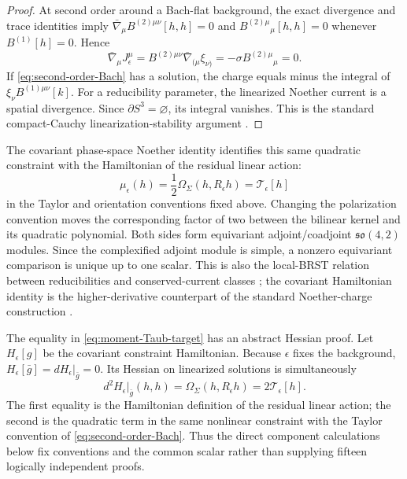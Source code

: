 \documentclass[11pt]{article}
\theoremstyle{definition}
\theoremstyle{remark}
\begin{document}
\begin{proof}
At second order around a Bach-flat background, the exact divergence and
trace identities imply
$\bar\nabla_\mu B^{(2)\mu\nu}[h,h]=0$ and
$B^{(2)\mu}{}_{\mu}[h,h]=0$ whenever $B^{(1)}[h]=0$.  Hence
\begin{equation}
 \bar\nabla_\mu J_\epsilon^\mu
 =B^{(2)\mu\nu}\bar\nabla_{(\mu}\xi_{\nu)}
 =-\sigma B^{(2)\mu}{}_{\mu}=0.
\end{equation}
If \eqref{eq:second-order-Bach} has a solution, the charge equals minus the
integral of $\xi_\nu B^{(1)\mu\nu}[k]$.  For a reducibility parameter, the
linearized Noether current is a spatial divergence.  Since
$\partial S^3=\varnothing$, its integral vanishes.  This is the standard
compact-Cauchy linearization-stability argument
\cite{AltasTekinLinearization,AltasTekinTaub}.
\end{proof}

The covariant phase-space Noether identity identifies this same quadratic
constraint with the Hamiltonian of the residual linear action:
\begin{equation}\label{eq:moment-Taub-target}
 \mu_\epsilon(h)
 =\frac12\Omega_\Sigma(h,R_\epsilon h)
 =\mathcal T_\epsilon[h]
\end{equation}
in the Taylor and orientation conventions fixed above.  Changing the
polarization convention moves the corresponding factor of two between the
bilinear kernel and its quadratic polynomial.  Both sides form equivariant
adjoint/coadjoint $\mathfrak{so}(4,2)$ modules.  Since the complexified
adjoint module is simple, a nonzero equivariant comparison is unique up to
one scalar.  This is also the local-BRST relation between reducibilities and
conserved-current classes
\cite{BarnichAntifield,BarnichBrandtHenneaux}; the covariant Hamiltonian
identity is the higher-derivative counterpart of the standard Noether-charge
construction \cite{IyerWald}.

The equality in \eqref{eq:moment-Taub-target} has an abstract Hessian proof.
Let $H_\epsilon[g]$ be the covariant constraint Hamiltonian.  Because
$\epsilon$ fixes the background,
$H_\epsilon[\bar g]=dH_\epsilon|_{\bar g}=0$.  Its Hessian on linearized
solutions is simultaneously
\begin{equation}\label{eq:Taub-Hessian}
 d^2H_\epsilon|_{\bar g}(h,h)
 =\Omega_\Sigma(h,R_\epsilon h)
 =2\mathcal T_\epsilon[h].
\end{equation}
The first equality is the Hamiltonian definition of the residual linear
action; the second is the quadratic term in the same nonlinear constraint
with the Taylor convention of \eqref{eq:second-order-Bach}.  Thus the direct
component calculations below fix conventions and the common scalar rather
than supplying fifteen logically independent proofs.
\end{document}
